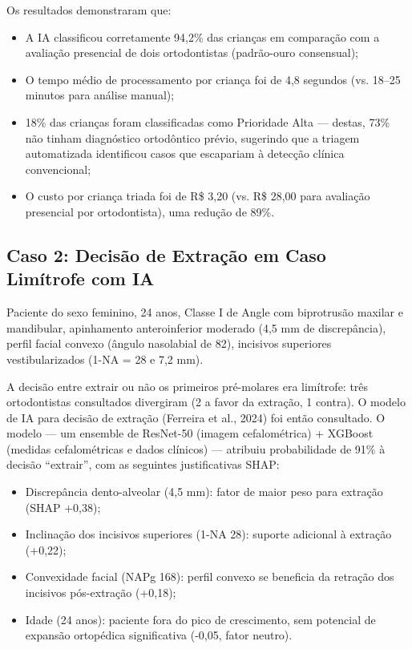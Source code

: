 Os resultados demonstraram que:
\begin{itemize}
    \item A IA classificou corretamente 94,2\% das crianças em comparação com a avaliação presencial de dois ortodontistas (padrão-ouro consensual);
    \item O tempo médio de processamento por criança foi de 4,8 segundos (vs. 18--25 minutos para análise manual);
    \item 18\% das crianças foram classificadas como Prioridade Alta --- destas, 73\% não tinham diagnóstico ortodôntico prévio, sugerindo que a triagem automatizada identificou casos que escapariam à detecção clínica convencional;
    \item O custo por criança triada foi de R\$ 3,20 (vs. R\$ 28,00 para avaliação presencial por ortodontista), uma redução de 89\%.
\end{itemize}

\subsection{Caso 2: Decisão de Extração em Caso Limítrofe com IA}

Paciente do sexo feminino, 24 anos, Classe I de Angle com biprotrusão maxilar e mandibular, apinhamento anteroinferior moderado (4,5 mm de discrepância), perfil facial convexo (ângulo nasolabial de 82\textdegree{}), incisivos superiores vestibularizados (1-NA = 28\textdegree{} e 7,2 mm).

A decisão entre extrair ou não os primeiros pré-molares era limítrofe: três ortodontistas consultados divergiram (2 a favor da extração, 1 contra). O modelo de IA para decisão de extração (Ferreira et al., 2024) foi então consultado. O modelo --- um ensemble de ResNet-50 (imagem cefalométrica) + XGBoost (medidas cefalométricas e dados clínicos) --- atribuiu probabilidade de 91\% à decisão ``extrair'', com as seguintes justificativas SHAP:

\begin{itemize}
    \item Discrepância dento-alveolar (4,5 mm): fator de maior peso para extração (SHAP +0,38);
    \item Inclinação dos incisivos superiores (1-NA 28\textdegree{}): suporte adicional à extração (+0,22);
    \item Convexidade facial (NAPg 168\textdegree{}): perfil convexo se beneficia da retração dos incisivos pós-extração (+0,18);
    \item Idade (24 anos): paciente fora do pico de crescimento, sem potencial de expansão ortopédica significativa (-0,05, fator neutro).
\end{itemize}

